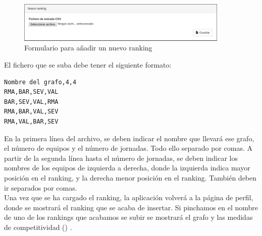 \begin{figure}[htb]
\centering
\includegraphics[width=0.9\textwidth]{imagenes/pantallazos-aplicacion/nuevo-ranking}
\caption{Formulario para añadir un nuevo ranking}
\label{fig:nuevo-ranking}
\end{figure}

El fichero que se suba debe tener el siguiente formato: 

\begin{verbatim}
Nombre del grafo,4,4
RMA,BAR,SEV,VAL
BAR,SEV,VAL,RMA 
RMA,BAR,VAL,SEV
RMA,VAL,BAR,SEV
\end{verbatim}

En la primera línea del archivo, se deben indicar el nombre que llevará ese grafo, el número de equipos y el número de jornadas. Todo ello separado por comas. A partir de la segunda línea hasta el número de jornadas, se deben indicar los nombres de los equipos de izquierda a derecha, donde la izquierda indica mayor posición en el ranking, y la derecha menor posición en el ranking. También deben ir separados por comas.\\

Una vez que se ha cargado el ranking, la aplicación volverá a la página de perfil, donde se mostrará el ranking que se acaba de insertar. Si pinchamos en el nombre de uno de los rankings que acabamos se subir se mostrará el grafo y las medidas de competitividad () . 

